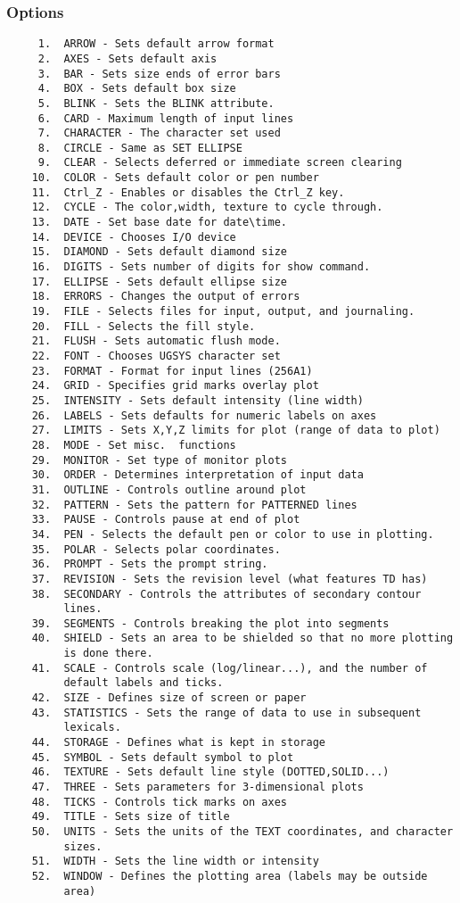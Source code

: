 \subsubsection{Options}
\begin{verbatim}
     1.  ARROW - Sets default arrow format 
     2.  AXES - Sets default axis 
     3.  BAR - Sets size ends of error bars 
     4.  BOX - Sets default box size 
     5.  BLINK - Sets the BLINK attribute.  
     6.  CARD - Maximum length of input lines 
     7.  CHARACTER - The character set used 
     8.  CIRCLE - Same as SET ELLIPSE 
     9.  CLEAR - Selects deferred or immediate screen clearing 
    10.  COLOR - Sets default color or pen number 
    11.  Ctrl_Z - Enables or disables the Ctrl_Z key.  
    12.  CYCLE - The color,width, texture to cycle through.  
    13.  DATE - Set base date for date\time.  
    14.  DEVICE - Chooses I/O device 
    15.  DIAMOND - Sets default diamond size 
    16.  DIGITS - Sets number of digits for show command.  
    17.  ELLIPSE - Sets default ellipse size 
    18.  ERRORS - Changes the output of errors 
    19.  FILE - Selects files for input, output, and journaling.  
    20.  FILL - Selects the fill style.  
    21.  FLUSH - Sets automatic flush mode.  
    22.  FONT - Chooses UGSYS character set 
    23.  FORMAT - Format for input lines (256A1) 
    24.  GRID - Specifies grid marks overlay plot 
    25.  INTENSITY - Sets default intensity (line width) 
    26.  LABELS - Sets defaults for numeric labels on axes 
    27.  LIMITS - Sets X,Y,Z limits for plot (range of data to plot) 
    28.  MODE - Set misc.  functions 
    29.  MONITOR - Set type of monitor plots 
    30.  ORDER - Determines interpretation of input data 
    31.  OUTLINE - Controls outline around plot 
    32.  PATTERN - Sets the pattern for PATTERNED lines 
    33.  PAUSE - Controls pause at end of plot 
    34.  PEN - Selects the default pen or color to use in plotting.  
    35.  POLAR - Selects polar coordinates.  
    36.  PROMPT - Sets the prompt string.  
    37.  REVISION - Sets the revision level (what features TD has) 
    38.  SECONDARY - Controls the attributes of secondary contour
         lines.  
    39.  SEGMENTS - Controls breaking the plot into segments 
    40.  SHIELD - Sets an area to be shielded so that no more plotting
         is done there.  
    41.  SCALE - Controls scale (log/linear...), and the number of
         default labels and ticks.  
    42.  SIZE - Defines size of screen or paper 
    43.  STATISTICS - Sets the range of data to use in subsequent
         lexicals.  
    44.  STORAGE - Defines what is kept in storage 
    45.  SYMBOL - Sets default symbol to plot 
    46.  TEXTURE - Sets default line style (DOTTED,SOLID...) 
    47.  THREE - Sets parameters for 3-dimensional plots 
    48.  TICKS - Controls tick marks on axes 
    49.  TITLE - Sets size of title 
    50.  UNITS - Sets the units of the TEXT coordinates, and character
         sizes.  
    51.  WIDTH - Sets the line width or intensity 
    52.  WINDOW - Defines the plotting area (labels may be outside
         area) 
\end{verbatim}
